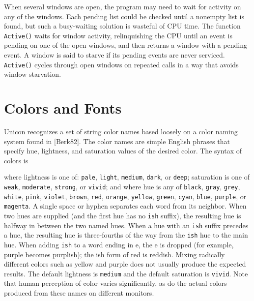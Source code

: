 When several windows are open, the program may need to wait for
activity on any of the windows. Each pending list could be checked
until a nonempty list is found, but such a busy-waiting solution is
wasteful of CPU time. The function \texttt{Active()} waits for window
activity, relinquishing the CPU until an event is pending on one of
the open windows, and then returns a window with a pending event. A
window is said to starve if its pending events are never
serviced. \texttt{Active()} cycles through open windows on repeated
calls in a way that avoids window starvation.

\section{Colors and Fonts}

Unicon recognizes a set of string color names based loosely on a color
naming system found in [Berk82]. The color names are simple English
phrases that specify hue, lightness, and saturation values of the
desired color. The syntax of colors is


\noindent
where lightness is one of: \texttt{pale}, \texttt{light},
\texttt{medium}, \texttt{dark}, or \texttt{deep}; saturation is one of
\texttt{weak}, \texttt{moderate}, \texttt{strong}, or \texttt{vivid};
and where hue is any of \texttt{black}, \texttt{gray}, \texttt{grey},
\texttt{white}, \texttt{pink}, \texttt{violet}, \texttt{brown},
\texttt{red}, \texttt{orange}, \texttt{yellow}, \texttt{green},
\texttt{cyan}, \texttt{blue}, \texttt{purple}, or \texttt{magenta}. A
single space or hyphen separates each word from its neighbor. When two
hues are supplied (and the first hue has no \texttt{ish} suffix), the
resulting hue is halfway in between the two named hues. When a hue
with an \texttt{ish} suffix precedes a hue, the resulting hue is
three-fourths of the way from the \texttt{ish} hue to the main
hue. When adding \texttt{ish} to a word ending in e, the e is dropped
(for example, purple becomes purplish); the ish form of red is
reddish. Mixing radically different colors such as yellow and purple
does not usually produce the expected results. The default lightness
is \texttt{medium} and the default saturation is \texttt{vivid}. Note
that human perception of color varies significantly, as do the actual
colors produced from these names on different monitors.

